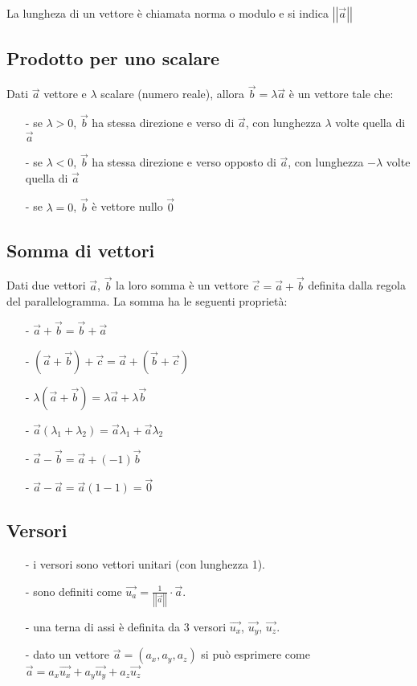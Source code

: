\documentclass[a4paper]{article}
\newcommand\vmod[1]{\left|\left|{#1}\right|\right|}
\begin{document}
La lungheza di un vettore è chiamata norma o modulo e si indica \(\vmod{\vec{a}}\)

\subsection{Prodotto per uno scalare}
Dati \(\vec{a}\) vettore e \(\lambda\) scalare (numero reale), allora \(\vec{b} = \lambda \vec{a}\) è un vettore tale che:
\begin{itemize}[topsep=3pt, itemsep=0pt]
	\item[-] se \(\lambda > 0\), \(\vec{b}\) ha stessa direzione e verso di \(\vec{a}\), con lunghezza \(\lambda\) volte quella di \(\vec{a}\)
	\item[-] se \(\lambda < 0\), \(\vec{b}\) ha stessa direzione e verso opposto di \(\vec{a}\), con lunghezza \(-\lambda\) volte quella di \(\vec{a}\)
	\item[-] se \(\lambda = 0\), \(\vec{b}\) è vettore nullo \(\vec{0}\)
\end{itemize}

\subsection{Somma di vettori}
Dati due vettori \(\vec{a}\), \(\vec{b}\) la loro somma è un vettore \(\vec{c} = \vec{a} + \vec{b}\) definita dalla regola del
parallelogramma. La somma ha le seguenti proprietà:
\begin{itemize}[topsep=3pt, itemsep=0pt]
	\item[-] \(\vec{a} + \vec{b} = \vec{b} + \vec{a}\)
	\item[-] \((\vec{a} + \vec{b}) + \vec{c} = \vec{a} + (\vec{b} + \vec{c})\)
	\item[-] \(\lambda (\vec{a} + \vec{b}) = \lambda \vec{a} + \lambda \vec{b}\)
	\item[-] \(\vec{a} (\lambda_1 + \lambda_2) = \vec{a} \lambda_1 + \vec{a} \lambda_2\)
	\item[-] \(\vec{a} - \vec{b} = \vec{a} + (-1)\vec{b}\)
	\item[-] \(\vec{a} - \vec{a} = \vec{a}(1-1) = \vec{0}\)
\end{itemize}	


\subsection{Versori}
\begin{itemize}[topsep=3pt, itemsep=0pt]
	\item[-] i versori sono vettori unitari (con lunghezza 1).
	\item[-] sono definiti come \(\vec{u_a} = \frac{1}{\vmod{\vec{a}}} \cdot \vec{a}\).
	\item[-] una terna di assi è definita da 3 versori \(\vec{u_x}\), \(\vec{u_y}\), \(\vec{u_z}\).
	\item[-] dato un vettore \(\vec{a} = \left(a_x, a_y, a_z\right)\) si può esprimere come \(\vec{a} = a_x \vec{u_x} + a_y \vec{u_y} + a_z \vec{u_z}\)
\end{itemize}
\end{document}
